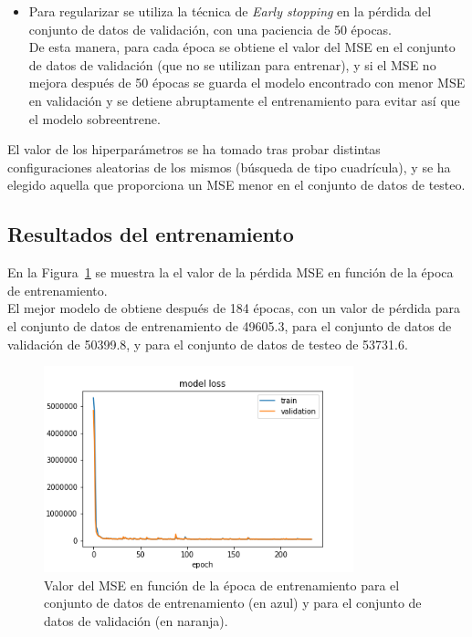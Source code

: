 \begin{itemize}
\item Para regularizar se utiliza la t\'ecnica de \textit{Early stopping} en la p\'erdida del conjunto de datos de validaci\'on, con una paciencia de 50 \'epocas. \\
De esta manera, para cada \'epoca se obtiene el valor del MSE en el conjunto de datos de validaci\'on (que no se utilizan para entrenar), y si el MSE no mejora despu\'es de 50 \'epocas se guarda el modelo encontrado con menor MSE en validaci\'on y se detiene abruptamente el entrenamiento para evitar as\'i que el modelo sobreentrene. 

\end{itemize}

El valor de los hiperpar\'ametros se ha tomado tras probar distintas configuraciones aleatorias de los mismos (b\'usqueda de tipo cuadr\'icula), y se ha elegido aquella que proporciona un MSE menor en el conjunto de datos de testeo.
  

\subsection{Resultados del entrenamiento}\label{sec:trainresults}

En la Figura~\ref{fig:model_loss} se muestra la el valor de la p\'erdida MSE en funci\'on de la \'epoca de entrenamiento. \\

El mejor modelo de obtiene despu\'es de 184 \'epocas, con un valor de p\'erdida para el conjunto de datos de entrenamiento de 49605.3, para el conjunto de datos de validaci\'on de 50399.8, y para el conjunto de datos de testeo de 53731.6.  \\

\begin{figure}[h]
\centering
\includegraphics[width=0.8\textwidth]{figures/model_loss.png}
\caption{Valor del MSE en funci\'on de la \'epoca de entrenamiento para el conjunto de datos de entrenamiento (en azul) y para el conjunto de datos de validaci\'on (en naranja).}
\label{fig:model_loss}        
\end{figure}


